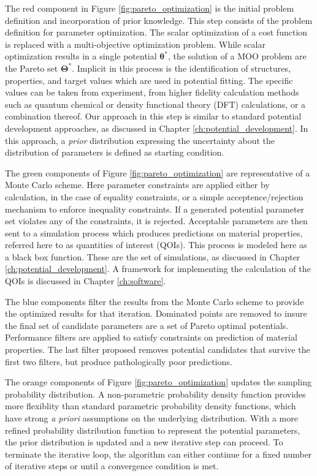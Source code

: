 The red component in Figure \ref{fig:pareto_optimization} is the initial problem definition and incorporation of prior knowledge.  This step consists of the problem definition for parameter optimization.  The scalar optimization of a cost function is replaced with a multi-objective optimization problem.  While scalar optimization results in a single potential $\bm{\theta}^*$, the solution of a MOO problem are the Pareto set $\bm{\Theta}^*$.  Implicit in this process is the identification of structures, properties, and target values which are used in potential fitting. The specific values can be taken from experiment, from higher fidelity calculation methods such as quantum chemical or density functional theory (DFT) calculations, or a combination thereof. Our approach in this step is similar to standard potential development approaches, as discussed in Chapter \ref{ch:potential_development}.  In this approach, a \emph{prior} distribution expressing the uncertainty about the distribution of parameters is defined as starting condition.

The green components of Figure \ref{fig:pareto_optimization} are representative of a Monte Carlo scheme.  Here parameter constraints are applied either by calculation, in the case of equality constraints, or a simple acceptence/rejection mechanism to enforce inequality constraints.  If a generated potential parameter set violates any of the constraints, it is rejected.  Acceptable parameters are then sent to a simulation process which produces predictions on material properties, referred here to as quantities of interest (QOIs).  This process is modeled here as a black box function. These are the set of simulations, as discussed in Chapter \ref{ch:potential_development}.  A framework for implementing the calculation of the QOIs is discussed in Chapter \ref{ch:software}.

The blue components filter the results from the Monte Carlo scheme to provide the optimized results for that iteration.  Dominated points are removed to insure the final set of candidate parameters are a set of Pareto optimal potentials.  Performance filters are applied to satisfy constraints on prediction of material properties.  The last filter proposed removes potential candidates that survive the first two filters, but produce pathologically poor predictions.

The orange components of Figure \ref{fig:pareto_optimization} updates the sampling probability distribution.  A non-parametric probability density function provides more flexiblity than standard parametric probability density functions, which have strong \emph{a priori} assumptions on the underlying distribution.  With a more refined probability distribution function to represent the potential parameters, the prior distribution is updated and a new iterative step can proceed.  To terminate the iterative loop, the algorithm can either continue for a fixed number of iterative steps or until a convergence condition is met.

